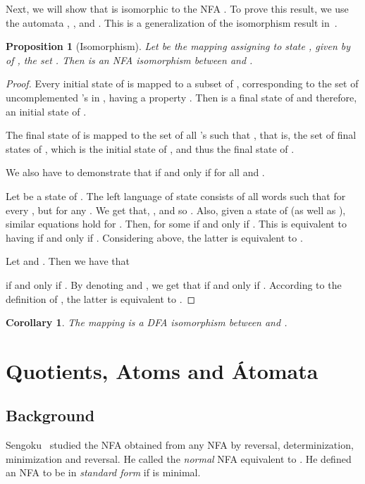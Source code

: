 \documentclass[preprint,12pt]{elsarticle}
\newtheorem{proposition}{Proposition}
\newtheorem{corollary}{Corollary}
\begin{document}
Next, we will show that  is isomorphic to the NFA . 
To prove this result, we use the automata 
,
, and
.
This is a generalization of the isomorphism result in~\cite{BrTa13}.

\begin{proposition}[Isomorphism]
\label{prop:isomorphism}
Let  be the mapping assigning to state 
, given by
 of , the set 
.
Then  is an NFA isomorphism between  and . 
\end{proposition}
\begin{proof}
Every initial state  of  is mapped to a subset  of , 
corresponding to the set of uncomplemented 's in , 
having a property . 
Then  is a final state of  and therefore, 
an initial state of .

The final state  of  is mapped to 
the set of all 's such that , that is, 
the set of final states of , 
which is the initial state of , 
and thus the final state of .

We also have to demonstrate that  if and 
only if 
for all  
and .

Let  be a state of .
The left language of state  consists of all words  such that 
 for every , 
but  for any .
We get that, , and so
.
Also, given a state  of  (as well as ), 
similar equations hold for . 
Then,  for some  if and only if
.
This is equivalent to having  if and only if
.
Considering above, the latter is equivalent to
.

Let  and .
Then we have that 
 
if and only if
.
By denoting  
and , 
we get that  
if and only if .
According to the definition of , the latter is equivalent to 
.
\end{proof}


\begin{corollary}
\label{cor:nfa_isomorphism}
The mapping  is a DFA isomorphism between  and 
.
\end{corollary}



\section{Quotients, Atoms and \'Atomata}
\label{sec:atoms}

\subsection{Background}
Sengoku~\cite{Sen92} studied the NFA  obtained from any NFA  by reversal, determinization, minimization and  reversal.  He called  the \emph{normal} NFA equivalent to . He defined an NFA  to be in \emph{standard form}
if  is minimal. 
\end{document}
